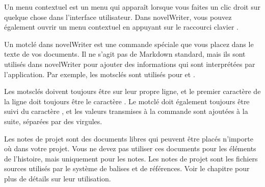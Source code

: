 \documentclass[a4paper,11pt,french]{sphinxmanual}
\begin{document}
\begin{description}
\sphinxAtStartPar
Un menu contextuel est un menu qui apparaît lorsque vous faites un clic droit sur quelque chose dans l’interface utilisateur. Dans novelWriter, vous pouvez également ouvrir un menu contextuel en appuyant sur le raccourci clavier .

\sphinxAtStartPar
Un mot\sphinxhyphen{}clé dans novelWriter est une commande spéciale que vous placez dans le texte de vos documents. Il ne s’agit pas de Markdown standard, mais ils sont utilisés dans novelWriter pour ajouter des informations qui sont interprétées par l’application. Par exemple, les mots\sphinxhyphen{}clés sont utilisés pour {\hyperref[\detokenize{int_glossary:term-Tag}]{}} et {\hyperref[\detokenize{int_glossary:term-Reference}]{}}.

\sphinxAtStartPar
Les mots\sphinxhyphen{}clés doivent toujours être sur leur propre ligne, et le premier caractère de la ligne doit toujours être le caractère . Le mot\sphinxhyphen{}clé doit également toujours être suivi du caractère \sphinxcode{\sphinxupquote{:}}, et les valeurs transmises à la commande sont ajoutées à la suite, séparées par des virgules.

\sphinxAtStartPar
Les notes de projet sont des documents libres qui peuvent être placés n’importe où dans votre projet. Vous ne devez pas utiliser ces documents pour les éléments de l’histoire, mais uniquement pour les notes. Les notes de projet sont les fichiers sources utilisés par le système de balises et de références. Voir le chapitre {\hyperref[\detokenize{project_references:a-references}]{}} pour plus de détails sur leur utilisation.


\end{description}
\end{document}
